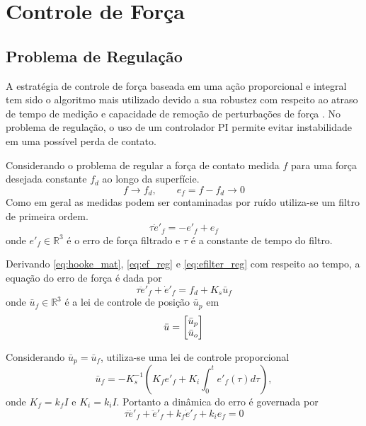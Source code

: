\section{Controle de Força}

\subsection{Problema de Regulação}

A estratégia de controle de força baseada em uma ação proporcional e integral tem sido o algoritmo mais utilizado devido a sua robustez com respeito ao atraso de tempo de medição e capacidade de remoção de perturbações de força \citep{wilfinger1994integral}. No problema de regulação, o uso de um controlador PI permite evitar instabilidade em uma possível perda de contato.

Considerando o problema de regular a força de contato medida $f$ para uma força desejada constante $f_d$ ao longo da superfície. 
\begin{equation} \label{eq:ef_reg}
f \rightarrow f_d, \qquad e_f = f - f_d \to 0
\end{equation}
Como em geral as medidas podem ser contaminadas por ruído utiliza-se um filtro de primeira ordem.
\begin{equation} \label{eq:efilter_reg}
\tau \dot{e}'_{f} = -e'_{f} + e_f 
\end{equation}
onde $e'_{f} \in \mathbb{R}^3$ é o erro de força filtrado e $\tau$ é a constante de tempo do filtro. 

Derivando \eqref{eq:hooke_mat}, \eqref{eq:ef_reg} e \eqref{eq:efilter_reg} com respeito ao tempo, a equação do erro de força é dada por 
\begin{equation}
\tau \ddot{e}'_{f} + \dot{e}'_f = {f}_d + K_s \bar{u}_f
\end{equation}
onde $\bar{u}_f \in \mathbb{R}^3$ é a lei de controle de posição $\bar{u}_p$ em
\begin{equation}
\bar{u} = \begin{bmatrix} \bar{u}_p \\ \bar{u}_o \end{bmatrix}
\end{equation}

Considerando $\bar{u}_p = \bar{u}_f$, utiliza-se uma lei de controle proporcional
\begin{equation} \label{eq:pi_force}
\bar{{u}}_f = -{K}_s^{-1} ({K}_f {e'}_f + {K}_i \int_0^t {e'}_f (\tau)d\tau),
\end{equation}
onde $K_f = k_f I$ e $K_i = k_i I$. Portanto a dinâmica do erro é governada por 
\begin{equation}
\tau \dddot{e}'_f + \ddot{e}'_f + k_f \dot{e}'_f + k_i e_f = 0
\end{equation}

